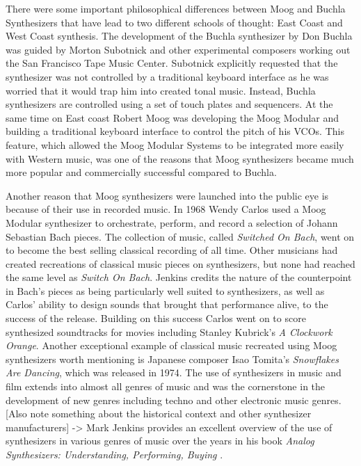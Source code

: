 There were some important philosophical differences between Moog and Buchla Synthesizers that have lead to two different schools of thought: East Coast and West Coast synthesis. The development of the Buchla synthesizer by Don Buchla was guided by Morton Subotnick and other experimental composers working out the San Francisco Tape Music Center. Subotnick explicitly requested that the synthesizer was not controlled by a traditional keyboard interface as he was worried that it would trap him into created tonal music. Instead, Buchla synthesizers are controlled using a set of touch plates and sequencers. At the same time on East coast Robert Moog was developing the Moog Modular and building a traditional keyboard interface to control the pitch of his VCOs. This feature, which allowed the Moog Modular Systems to be integrated more easily with Western music, was one of the reasons that Moog synthesizers became much more popular and commercially successful compared to Buchla. 

Another reason that Moog synthesizers were launched into the public eye is because of their use in recorded music. In 1968 Wendy Carlos used a Moog Modular synthesizer to orchestrate, perform, and record a selection of Johann Sebastian Bach pieces. The collection of music, called \textit{Switched On Bach}, went on to become the best selling classical recording of all time. Other musicians had created recreations of classical music pieces on synthesizers, but none had reached the same level as \textit{Switch On Bach}. Jenkins \cite{jenkins2019analog} credits the nature of the counterpoint in Bach's pieces as being particularly well suited to synthesizers, as well as Carlos' ability to design sounds that brought that performance alive, to the success of the release. Building on this success Carlos went on to score synthesized soundtracks for movies including Stanley Kubrick's \textit{A Clockwork Orange}. Another exceptional example of classical music recreated using Moog synthesizers worth mentioning is Japanese composer Isao Tomita's \textit{Snowflakes Are Dancing}, which was released in 1974. The use of synthesizers in music and film extends into almost all genres of music and was the cornerstone in the development of new genres including techno and other electronic music genres. [Also note something about the historical context and other synthesizer manufacturers] -> Mark Jenkins provides an excellent overview of the use of synthesizers in various genres of music over the years in his book \textit{Analog Synthesizers: Understanding, Performing, Buying} \cite{jenkins2019analog}.

